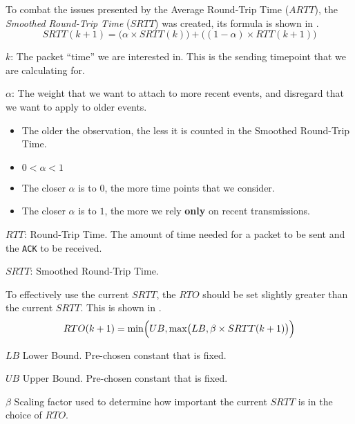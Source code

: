 To combat the issues presented by the Average Round-Trip Time ($ARTT$), the \emph{Smoothed Round-Trip Time} ($SRTT$) was created, its formula is shown in .
\begin{equation}\label{eq:Smoothed_Round_Trip_Time}
  SRTT(k+1) = \bigl( \alpha \times SRTT(k) \bigr) + \bigl( (1-\alpha) \times RTT(k+1) \bigr)
\end{equation}
\begin{description}[noitemsep]
\item $k$: The packet ``time'' we are interested in. This is the sending timepoint that we are calculating for.
\item $\alpha$: The weight that we want to attach to more recent events, and disregard that we want to apply to older events.
  \begin{itemize}[noitemsep]
  \item The older the observation, the less it is counted in the Smoothed Round-Trip Time.
  \item $0 < \alpha < 1$
  \item The closer $\alpha$ is to $0$, the more time points that we consider.
  \item The closer $\alpha$ is to $1$, the more we rely \textbf{only} on recent transmissions.
  \end{itemize}
\item $RTT$: Round-Trip Time. The amount of time needed for a packet to be sent and the \texttt{ACK} to be received.
\item $SRTT$: Smoothed Round-Trip Time.
\end{description}

To effectively use the current $SRTT$, the $RTO$ should be set slightly greater than the current $SRTT$.
This is shown in .
\begin{equation}\label{eq:RTO_Based_SRTT}
  RTO(k+1) = \min \Bigl( UB, \max \bigl( LB, \beta \times SRTT(k+1) \bigr) \Bigr)
\end{equation}
\begin{description}[noitemsep]
\item $LB$ Lower Bound. Pre-chosen constant that is fixed.
\item $UB$ Upper Bound. Pre-chosen constant that is fixed.
\item $\beta$ Scaling factor used to determine how important the current $SRTT$ is in the choice of $RTO$.
\end{description}

